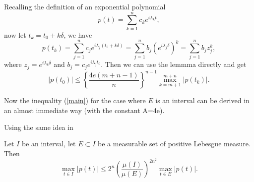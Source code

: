 Recalling the definition of an exponential polynomial
\[
  p(t)=\sum_{k=1}^{n} c_k e^{i\lambda_k t},
\] 
now let $t_k=t_0+k\delta$, we have 
\[
  p(t_k)=\sum_{j=1}^{n} c_j e^{i\lambda_j (t_0+k\delta)}=\sum_{j=1}^{n} b_j \left(e^{i\lambda_j\delta}\right)^{k}=\sum_{j=1}^{n} b_j z_j^{k},
\] 
where $z_j=e^{i\lambda_k\delta}$ and $b_j=c_j e^{i\lambda_j t_0}$.
Then we can use the lemmma directly and get 
\begin{equation}
  \left| p(t_0) \right| \le \left\{  \frac{4e(m+n-1)}{n} \right\}^{n-1}\max_{k=m+1}^{m+n}\left| p(t_k) \right| . \label{poly-1}
\end{equation}

Now the inequality (\ref{main}) for the case where $E$ is an interval can be derived in an almost immediate way (with the constant A=4e).

Using the same idea in 
\begin{theorem}\label{theorem-2}
  Let $I$ be an interval, let $E\subset I$ be a measurable set of positive Lebesgue measure. Then
  \begin{equation}
    \max_{t\in I}\left| p(t) \right| \le 2^{n}\left( \frac{\mu(I)}{\mu(E)} \right) ^{2n^2}\max_{t\in E}\left| p(t) \right| .
  \end{equation}
\end{theorem}
